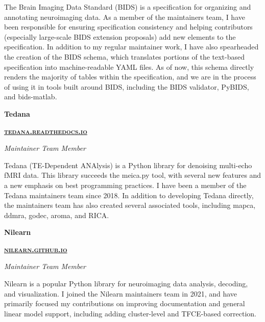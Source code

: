\documentclass[10pt]{article}
\newcommand{\shorturl}[1]{\href{https://#1}{\textsc{#1}}}
\begin{document}
\begin{adjustwidth}{2em}{0em}
	The Brain Imaging Data Standard (BIDS) is a specification for organizing and annotating neuroimaging data.
	As a member of the maintainers team, I have been responsible for ensuring specification consistency
	and helping contributors (especially large-scale BIDS extension proposals) add new elements to the specification.
	In addition to my regular maintainer work, I have also spearheaded the creation of the BIDS schema,
	which translates portions of the text-based specification into machine-readable YAML files.
	As of now, this schema directly renders the majority of tables within the specification,
	and we are in the process of using it in tools built around BIDS, including the BIDS validator, PyBIDS, and bids-matlab.
\end{adjustwidth}

\bigskip

\begin{minipage}[t]{.5\linewidth}
	\flushleft
	\noindent
	\textbf{Tedana}
\end{minipage}
\hfill
\begin{minipage}[t]{.5\linewidth}
	\flushright
	\noindent
	\textbf{\shorturl{tedana.readthedocs.io}}
\end{minipage}

\emph{Maintainer Team Member}

\begin{adjustwidth}{2em}{0em}
	Tedana (TE-Dependent ANAlysis) is a Python library for denoising multi-echo fMRI data.
	This library succeeds the meica.py tool, with several new features and a new emphasis on best programming practices.
	I have been a member of the Tedana maintainers team since 2018.
	In addition to developing Tedana directly, the maintainers team has also created several associated tools,
	including mapca, ddmra, godec, aroma, and RICA.
\end{adjustwidth}

\bigskip

\begin{minipage}[t]{.5\linewidth}
	\flushleft
	\noindent
	\textbf{Nilearn}
\end{minipage}
\hfill
\begin{minipage}[t]{.5\linewidth}
	\flushright
	\noindent
	\textbf{\shorturl{nilearn.github.io}}
\end{minipage}

\emph{Maintainer Team Member}

\begin{adjustwidth}{2em}{0em}
	Nilearn is a popular Python library for neuroimaging data analysis, decoding, and visualization.
	I joined the Nilearn maintainers team in 2021, and have primarily focused my contributions on improving
	documentation and general linear model support, including adding cluster-level and TFCE-based correction.
\end{adjustwidth}
\end{document}
